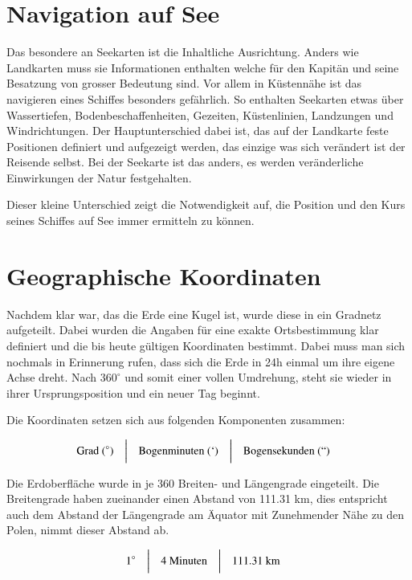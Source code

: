 \begin{refsection}
\section{Navigation auf See}
Das besondere an Seekarten ist die Inhaltliche Ausrichtung. Anders wie Landkarten muss sie Informationen enthalten welche für den Kapitän und seine Besatzung von grosser Bedeutung sind. Vor allem in Küstennähe ist das navigieren eines Schiffes besonders gefährlich. So enthalten Seekarten etwas über Wassertiefen, Bodenbeschaffenheiten, Gezeiten, Küstenlinien, Landzungen und Windrichtungen.
Der Hauptunterschied dabei ist, das auf der Landkarte feste Positionen definiert und aufgezeigt werden, das einzige was sich verändert ist der Reisende selbst. Bei der Seekarte ist das anders, es werden veränderliche Einwirkungen der Natur festgehalten.

Dieser kleine Unterschied zeigt die Notwendigkeit auf, die Position und den Kurs seines Schiffes auf See immer ermitteln zu können.


\section{Geographische Koordinaten}

Nachdem klar war, das die Erde eine Kugel ist, wurde diese in ein Gradnetz aufgeteilt. Dabei wurden die Angaben für eine exakte Ortsbestimmung klar definiert und die bis heute gültigen Koordinaten bestimmt.
Dabei muss man sich nochmals in Erinnerung rufen, dass sich die Erde in 24h einmal um ihre eigene Achse dreht. Nach $360 ^{\circ}$ 
und somit einer vollen Umdrehung, steht sie wieder in ihrer Ursprungsposition und ein neuer Tag beginnt.

Die Koordinaten setzen sich aus folgenden Komponenten zusammen:

\[
\begin{aligned}
&\text{Grad } (^{\circ})
&
&\text{\bigg \vert}
&
&\text{Bogenminuten } (`)
&
&\text{\bigg \vert}
&
&\text{Bogensekunden } (``)
\end{aligned}
\]

Die Erdoberfläche wurde in je 360 Breiten- und Längengrade eingeteilt. Die Breitengrade haben zueinander einen Abstand von 111.31 km, dies entspricht auch dem Abstand der Längengrade am Äquator mit Zunehmender Nähe zu den Polen, nimmt dieser Abstand ab.

\[
\begin{aligned}
&1^{\circ}
&
&\text{\bigg \vert}
&
&4 \text{ Minuten}
&
&\text{\bigg \vert}
&
&111.31\text{ km}
\end{aligned}
\]


\end{refsection}
